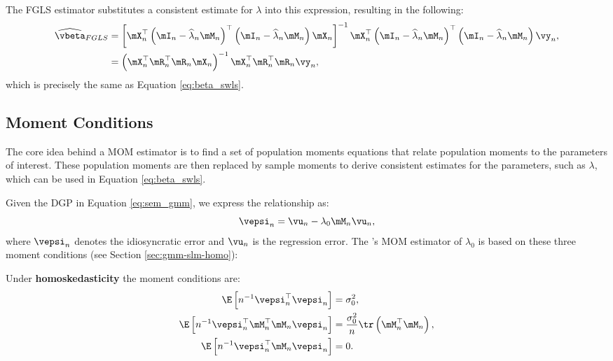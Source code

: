 \documentclass[english,12pt]{book}\usepackage[]{graphicx}\usepackage[]{xcolor}
\begin{document}
The FGLS estimator substitutes a consistent estimate for $\lambda$ into this expression, resulting in the following:
\begin{equation*}
\begin{aligned}
  \widehat{\vbeta}_{FGLS} & =\left[\mX^\top_n\left(\mI_n - \widehat{\lambda}_n\mM_n\right)^\top\left(\mI_n - \widehat{\lambda}_n\mM_n\right)\mX_n\right]^{-1}\mX^\top_n\left(\mI_n - \widehat{\lambda}_n\mM_n\right)^\top\left(\mI_n - \widehat{\lambda}_n\mM_n\right)\vy_n, \\
  & = \left(\mX_n^\top \mR_{n}^\top\mR_{n}\mX_n\right)^{-1} \mX_n^\top \mR_{n}^\top\mR_{n}\vy_n,
  \end{aligned}
\end{equation*}
%
which is precisely the same as Equation \eqref{eq:beta_swls}.

\subsection{Moment Conditions}\label{section:Moment_Condtions}

The core idea behind a MOM estimator is to find a set of population moments equations that relate population moments to the parameters of interest. These population moments are then replaced by sample moments to derive consistent estimates for the parameters, such as $\lambda$, which can be used in Equation \eqref{eq:beta_swls}.

Given the DGP in Equation \eqref{eq:sem_gmm}, we express the relationship as: 
\begin{equation*}
  \vepsi_n = \vu_n - \lambda_0\mM_n\vu_n,
\end{equation*}
%
where $\vepsi_n$ denotes the idiosyncratic error and $\vu_n$ is the regression error. The \cite{kelejian1999generalized}'s MOM estimator of $\lambda_0$ is based on these three moment conditions  (see Section \ref{sec:gmm-slm-homo}):

\begin{definition}\label{def:moment-conditions-homo}
Under \textbf{homoskedasticity} \citep{kelejian1999generalized} the moment conditions are:
\begin{equation*}
  \begin{aligned}
  \E\left[n^{-1}\vepsi^\top_n \vepsi_n\right] &= \sigma^2_0, \\
   \E\left[n^{-1}\vepsi^\top_n\mM_n^\top\mM_n\vepsi_n\right] &= \frac{\sigma^2_0}{n}\tr\left(\mM^\top_n\mM_n\right),\\
   \E\left[n^{-1}\vepsi^\top_n \mM_n \vepsi_n \right] & =  0.
  \end{aligned}
\end{equation*}
\end{definition}
\end{document}
